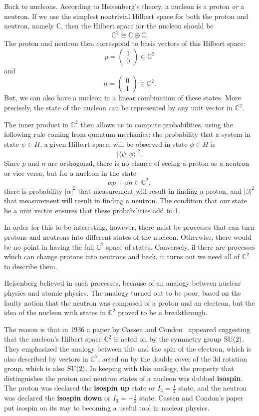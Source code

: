 \documentclass[12pt]{article}
\newcommand{\C}{{\mathbb C}}  %
\newcommand{\SU}{{\rm SU}}    %
\newcommand{\iso}{\cong} %
\newcommand{\half}{\frac{1}{2}} %
\begin{document}
Back to nucleons. According to Heisenberg's theory, a nucleon is a
proton \textit{or} a neutron.  If we use the simplest nontrivial Hilbert
space for both the proton and neutron, namely $\C$, then the Hilbert
space for the nucleon should be
\[       \C^2 \iso \C \oplus \C.	\]
The proton and neutron then correspond to basis vectors of this Hilbert
space:
\[	p = \left( \begin{array}{c} 1 \\ 0 \end{array} \right) \in \C^2	\]
and
\[	n = \left( \begin{array}{c} 0 \\ 1 \end{array} \right) \in \C^2.	\]
But, we can also have a nucleon in a linear combination of 
these states.  More precisely, the state of the nucleon can be represented 
by any  unit vector in $\C^2$. 

The inner product in $\C^2$ then allows us to compute probabilities, using the
following rule coming from quantum mechanics: the probability that a system in
state $\psi \in H$, a given Hilbert space, will be observed in state $\phi \in
H$ is
\[	\left| \langle \psi , \phi \rangle \right|^2.	\]
Since $p$ and $n$ are orthogonal, there is no chance of seeing a proton as
a neutron or vice versa, but for a nucleon in the state
\[	\alpha p + \beta n \in \C^2,	\]
there is probability $| \alpha |^2$ that
measurement will result in finding a proton, and $|\beta|^2$ that 
measurement will result in finding a neutron.  The condition that our
state be a unit vector ensures that these probabilities add to 1.

In order for this to be interesting, however, there must be
processes that can turn protons and neutrons into different states of
the nucleon. Otherwise, there would be no point in having the full
$\C^2$ space of states.  Conversely, if there are processes which can
change protons into neutrons and back, it turns out we need all of 
$\C^2$ to describe them.

Heisenberg believed in such processes, because of an analogy between
nuclear physics and atomic physics. The analogy turned out to be poor,
based on the faulty notion that the neutron was composed of a proton
and an electron, but the idea of the nucleon with states in $\C^2$
proved to be a breakthrough.

The reason is that in 1936 a paper by Cassen and
Condon~\cite{CassenCondon:nuclearforces} appeared suggesting that the
nucleon's Hilbert space $\C^2$ is acted on by the symmetry group $\SU(2)$. 
They emphasized the analogy between this and the spin of the electron,
which is also described by vectors in $\C^2$, acted on by the double
cover of the 3d rotation group, which is also $\SU(2)$.  In keeping with 
this analogy, the property that distinguishes the proton
and neutron states of a nucleon was dubbed \textbf{isospin}.  The
proton was declared the \textbf{isospin up} state or $I_3 = \half$
state, and the neutron was declared the \textbf{isospin down} or $I_3 =
-\half$ state. Cassen and Condon's paper put isospin on its way to
becoming a useful tool in nuclear physics.
\end{document}
